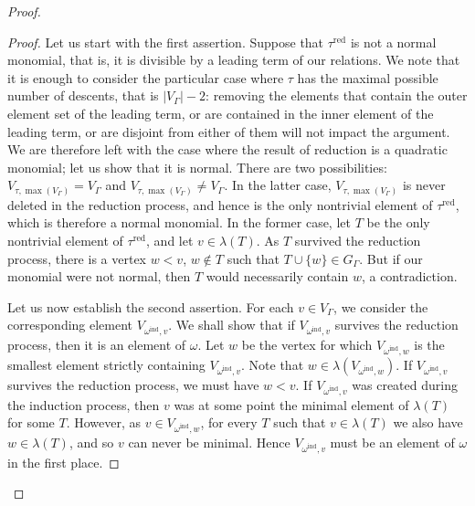 \begin{proof}
\begin{proof}
Let us start with the first assertion. Suppose that $\tau^{\mathrm{red}}$ is not a normal monomial, that is, it is divisible by a leading term of our relations. We note that it is enough to consider the particular case where $\tau$ has the maximal possible number of descents, that is $|V_\Gamma|-2$: removing the elements that contain the outer element set of the leading term, or are contained in the inner element of the leading term, or are disjoint from either of them will not impact the argument. We are therefore left with the case where the result of reduction is a quadratic monomial; let us show that it is normal. There are two possibilities: $V_{\tau,\max(V_\Gamma)}=V_\Gamma$ and $V_{\tau,\max(V_\Gamma)}\ne V_\Gamma$. In the latter case, $V_{\tau,\max(V_\Gamma)}$ is never deleted in the reduction process, and hence is the only nontrivial element of $\tau^{\mathrm{red}}$, which is therefore a normal monomial. In the former case, let $T$ be the only nontrivial element of $\tau^{\mathrm{red}}$, and let $v\in\lambda(T)$. As $T$ survived the reduction process, there is a vertex $w<v$, $w\not\in T$ such that $T\cup\{w\}\in G_\Gamma$. But if our monomial were not normal, then $T$ would necessarily contain $w$, a contradiction. 

Let us now establish the second assertion. For each $v\in V_\Gamma$, we consider the corresponding element $V_{\omega^{\mathrm{ind}},v}$. We shall show that if $V_{\omega^{\mathrm{ind}},v}$ survives the reduction process, then it is an element of $\omega$. Let $w$ be the vertex for which $V_{\omega^{\mathrm{ind}},w}$ is the smallest element strictly containing $V_{\omega^{\mathrm{ind}},v}$. Note that $w\in\lambda(V_{\omega^{\mathrm{ind}},w})$. If $V_{\omega^{\mathrm{ind}},v}$ survives the reduction process, we must have $w<v$. If $V_{\omega^{\mathrm{ind}},v}$ was created during the induction process, then $v$ was at some point the minimal element of $\lambda(T)$ for some $T$. However, as $v\in V_{\omega^{\mathrm{ind}},w}$, for every $T$ such that $v\in \lambda(T)$ we also have $w\in\lambda(T)$, and so $v$ can never be minimal. Hence $V_{\omega^{\mathrm{ind}},v}$ must be an element of $\omega$ in the first place.


\end{proof}
\end{proof}
